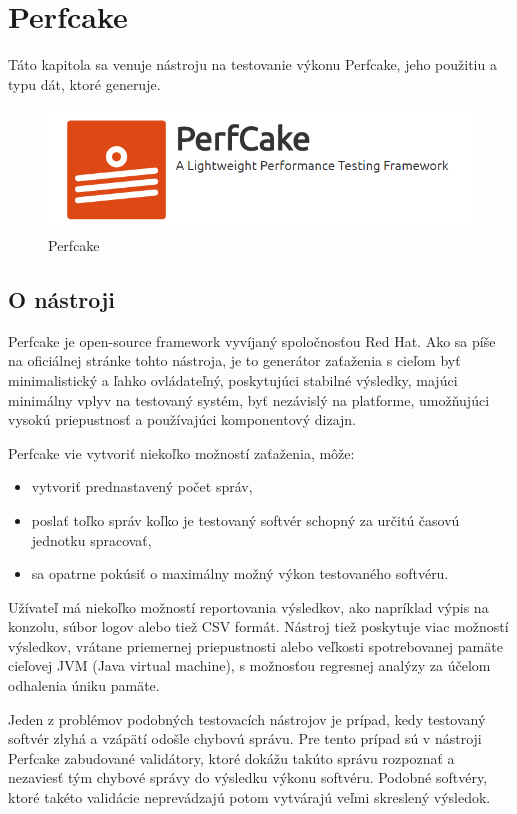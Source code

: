\chapter{Perfcake}\label{perfcake}
\setcounter{page}{1}

Táto kapitola sa venuje nástroju na testovanie výkonu Perfcake, jeho použitiu a typu dát, ktoré generuje. 

\begin{figure}[ht]
\includegraphics[scale=1]{blog-logo.png}
\caption{Perfcake}
\end{figure} 

\section{O nástroji}

Perfcake je open-source framework vyvíjaný spoločnosťou Red Hat. Ako sa píše na oficiálnej stránke tohto nástroja, je to generátor zaťaženia s cieľom byť minimalistický a ľahko ovládateľný, poskytujúci stabilné výsledky, majúci minimálny vplyv na testovaný systém, byť nezávislý na platforme, umožňujúci vysokú priepustnosť a používajúci komponentový dizajn.

Perfcake vie vytvoriť niekoľko možností zaťaženia, môže:
\begin{itemize}  
\item vytvoriť prednastavený počet správ,
\item poslať toľko správ koľko je testovaný softvér schopný za určitú časovú jednotku spracovať,
\item sa opatrne pokúsiť o maximálny možný výkon testovaného softvéru.
\end{itemize}

Užívateľ má niekoľko možností reportovania výsledkov, ako napríklad výpis na konzolu, súbor logov alebo tiež CSV formát. Nástroj tiež poskytuje viac možností výsledkov, vrátane priemernej priepustnosti alebo veľkosti spotrebovanej pamäte cieľovej JVM (Java virtual machine), s možnosťou regresnej analýzy za účelom odhalenia úniku pamäte.

Jeden z problémov podobných testovacích nástrojov je prípad, kedy testovaný softvér zlyhá a vzápätí odošle chybovú správu. Pre tento prípad sú v nástroji Perfcake zabudované validátory, ktoré dokážu takúto správu rozpoznať a nezaviesť tým chybové správy do výsledku výkonu softvéru. Podobné softvéry, ktoré takéto validácie neprevádzajú potom vytvárajú veľmi skreslený výsledok.

